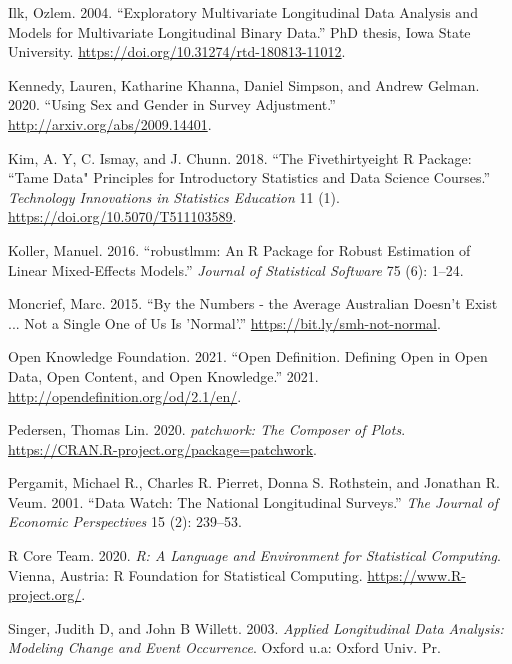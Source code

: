 \documentclass[12pt]{article}
\begin{document}
\leavevmode\hypertarget{ref-ilk2004}{}%
Ilk, Ozlem. 2004. ``Exploratory Multivariate Longitudinal Data Analysis and Models for Multivariate Longitudinal Binary Data.'' PhD thesis, Iowa State University. \url{https://doi.org/10.31274/rtd-180813-11012}.

\leavevmode\hypertarget{ref-kennedy2020using}{}%
Kennedy, Lauren, Katharine Khanna, Daniel Simpson, and Andrew Gelman. 2020. ``Using Sex and Gender in Survey Adjustment.'' \url{http://arxiv.org/abs/2009.14401}.

\leavevmode\hypertarget{ref-tamedata}{}%
Kim, A. Y, C. Ismay, and J. Chunn. 2018. ``The Fivethirtyeight R Package: ``Tame Data" Principles for Introductory Statistics and Data Science Courses.'' \emph{Technology Innovations in Statistics Education} 11 (1). \url{https://doi.org/10.5070/T511103589}.

\leavevmode\hypertarget{ref-KollerManuel2016rARP}{}%
Koller, Manuel. 2016. ``robustlmm: An R Package for Robust Estimation of Linear Mixed-Effects Models.'' \emph{Journal of Statistical Software} 75 (6): 1--24.

\leavevmode\hypertarget{ref-notaverage}{}%
Moncrief, Marc. 2015. ``By the Numbers - the Average Australian Doesn't Exist ... Not a Single One of Us Is 'Normal'.'' \url{https://bit.ly/smh-not-normal}.

\leavevmode\hypertarget{ref-opendata}{}%
Open Knowledge Foundation. 2021. ``Open Definition. Defining Open in Open Data, Open Content, and Open Knowledge.'' 2021. \url{http://opendefinition.org/od/2.1/en/}.

\leavevmode\hypertarget{ref-patchwork}{}%
Pedersen, Thomas Lin. 2020. \emph{patchwork: The Composer of Plots}. \url{https://CRAN.R-project.org/package=patchwork}.

\leavevmode\hypertarget{ref-MichaelRPergamit2001DWTN}{}%
Pergamit, Michael R., Charles R. Pierret, Donna S. Rothstein, and Jonathan R. Veum. 2001. ``Data Watch: The National Longitudinal Surveys.'' \emph{The Journal of Economic Perspectives} 15 (2): 239--53.

\leavevmode\hypertarget{ref-R}{}%
R Core Team. 2020. \emph{R: A Language and Environment for Statistical Computing}. Vienna, Austria: R Foundation for Statistical Computing. \url{https://www.R-project.org/}.

\leavevmode\hypertarget{ref-SingerJudithD2003Alda}{}%
Singer, Judith D, and John B Willett. 2003. \emph{Applied Longitudinal Data Analysis: Modeling Change and Event Occurrence}. Oxford u.a: Oxford Univ. Pr.
\end{document}
